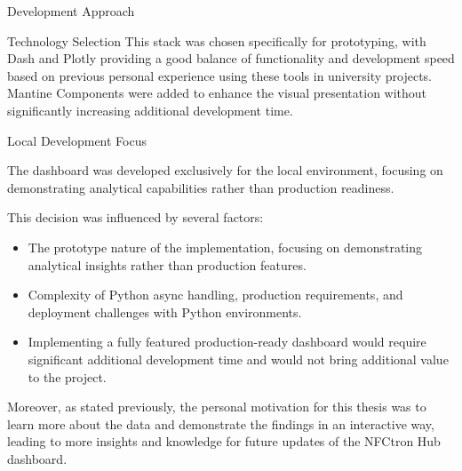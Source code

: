 \begin{section}{Development Approach}
\begin{subsection}{Technology Selection}
		This stack was chosen specifically for prototyping, with Dash and Plotly providing a good balance of functionality
		and development speed\cite{plotly_dash_plotly_com} based on previous personal experience using these tools in university projects.
		Mantine Components were added to enhance the visual presentation without significantly increasing additional development time.
	\end{subsection}

	\begin{subsection}{Local Development Focus}
		\label{subsec:implementation-development-approach-local}

		The dashboard was developed exclusively for the local environment, focusing on demonstrating analytical capabilities rather than production readiness.

		\vspace*{\fill}\pagebreak[4] %

		This decision was influenced by several factors:
		\begin{itemize}
			\item The prototype nature of the implementation, focusing on demonstrating analytical insights rather than production features.
			\item Complexity of Python async handling, production requirements, and deployment challenges with Python environments.
			\item Implementing a fully featured production-ready dashboard would require significant additional development time and would not bring additional value to the project.
		\end{itemize}

		Moreover, as stated previously, the personal motivation for this thesis was to learn more about the data and demonstrate the findings in an interactive way, leading to more insights and knowledge for future updates of the NFCtron Hub dashboard.

	\end{subsection}
\end{section}

